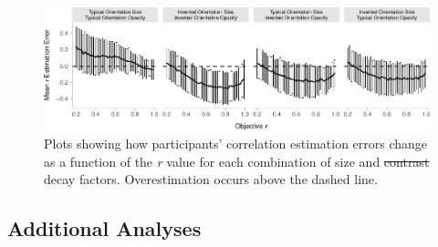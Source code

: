 \documentclass[manuscript, review, anonymous, screen]{acmart}
\providecommand{\DIFaddtex}[1]{{\protect\color{blue}\uwave{#1}}} %
\providecommand{\DIFdeltex}[1]{{\protect\color{red}\sout{#1}}}                      %
\providecommand{\DIFaddFL}[1]{\DIFadd{#1}} %
\providecommand{\DIFdelFL}[1]{\DIFdel{#1}} %
\providecommand{\DIFaddbeginFL}{} %
\providecommand{\DIFaddendFL}{} %
\providecommand{\DIFdelbeginFL}{} %
\providecommand{\DIFdelendFL}{} %
\providecommand{\DIFadd}[1]{\texorpdfstring{\DIFaddtex{#1}}{#1}} %
\providecommand{\DIFdel}[1]{\texorpdfstring{\DIFdeltex{#1}}{}} %
\newcommand{\DIFscaledelfig}{0.5}
\newlength{\DIFdelgraphicswidth} %
\newlength{\DIFdelgraphicsheight} %
\newcommand{\DIFaddincludegraphics}[2][]{{\color{blue}\fbox{\DIFOincludegraphics[#1]{#2}}}} %
\newcommand{\DIFdelincludegraphics}[2][]{%
\sbox{\DIFdelgraphicsbox}{\DIFOincludegraphics[#1]{#2}}%
\settoboxwidth{\DIFdelgraphicswidth}{\DIFdelgraphicsbox} %
\settoboxtotalheight{\DIFdelgraphicsheight}{\DIFdelgraphicsbox} %
\scalebox{\DIFscaledelfig}{%
\parbox[b]{\DIFdelgraphicswidth}{\usebox{\DIFdelgraphicsbox}\\[-\baselineskip] \rule{\DIFdelgraphicswidth}{0em}}\llap{\resizebox{\DIFdelgraphicswidth}{\DIFdelgraphicsheight}{%
\setlength{\unitlength}{\DIFdelgraphicswidth}%
\begin{picture}(1,1)%
\thicklines\linethickness{2pt} %
{\color[rgb]{1,0,0}\put(0,0){\framebox(1,1){}}}%
{\color[rgb]{1,0,0}\put(0,0){\line( 1,1){1}}}%
{\color[rgb]{1,0,0}\put(0,1){\line(1,-1){1}}}%
\end{picture}%
}\hspace*{3pt}}} %
} %
\DeclareRobustCommand{\DIFaddbeginFL}{\DIFOaddbeginFL \let\includegraphics\DIFaddincludegraphics} %
\DeclareRobustCommand{\DIFaddendFL}{\DIFOaddendFL \let\includegraphics\DIFOincludegraphics} %
\DeclareRobustCommand{\DIFdelbeginFL}{\DIFOdelbeginFL \let\includegraphics\DIFdelincludegraphics} %
\DeclareRobustCommand{\DIFdelendFL}{\DIFOaddendFL \let\includegraphics\DIFOincludegraphics} %
\begin{document}
\begin{figure}

{\centering \includegraphics[width=1\textwidth,height=\textheight]{size_and_opacity_files/figure-pdf/fig-diff-error-bars-plot-1.pdf}

}

\caption{\label{fig-diff-error-bars-plot}Plots showing how participants'
correlation estimation errors change as a function of the \emph{r} value
for each combination of size and \DIFdelbeginFL \DIFdelFL{contrast }\DIFdelendFL \DIFaddbeginFL \DIFaddFL{opacity }\DIFaddendFL decay factors. Overestimation
occurs above the dashed line.}

\end{figure}

\hypertarget{sec-add-analyses}{%
\subsection{Additional Analyses}\label{sec-add-analyses}}
\end{document}
